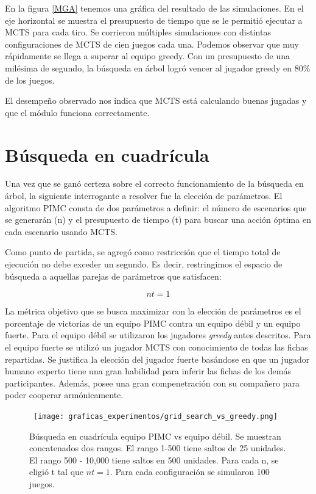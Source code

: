En la figura \ref{MGA} tenemos una gráfica del resultado de las simulaciones. En
el eje horizontal se muestra el presupuesto de tiempo que se le permitió
ejecutar a MCTS para cada tiro. Se corrieron múltiples simulaciones con
distintas configuraciones de MCTS de cien juegos cada una. Podemos observar que
muy rápidamente se llega a superar al equipo greedy. Con un presupuesto de una
milésima de segundo, la búsqueda en árbol logró vencer al jugador greedy en 80\%
de los juegos.

El desempeño observado nos indica que MCTS está calculando buenas jugadas y que
el módulo funciona correctamente.


\section{Búsqueda en cuadrícula}

Una vez que se ganó certeza sobre el correcto funcionamiento de la búsqueda en
árbol, la siguiente interrogante a resolver fue la elección de parámetros. El
algoritmo PIMC consta de dos parámetros a definir: el número de escenarios que
se generarán (n) y el presupuesto de tiempo (t) para buscar una acción óptima en
cada escenario usando MCTS.

Como punto de partida, se agregó como restricción que el tiempo total de
ejecución no debe exceder un segundo. Es decir, restringimos el espacio de
búsqueda a aquellas parejas de parámetros que satisfacen: 


\[nt = 1 \]

La métrica objetivo que se busca maximizar con la elección de parámetros es el
porcentaje de victorias de un equipo PIMC contra un equipo débil y un equipo
fuerte. Para el equipo débil se utilizaron los jugadores \textit{greedy} antes
descritos. Para el equipo fuerte se utilizó un jugador MCTS con conocimiento de
todas las fichas repartidas. Se justifica la elección del jugador fuerte
basándose en que un jugador humano experto tiene una gran habilidad para inferir
las fichas de los demás participantes. Además, posee una gran compenetración con
su compañero para poder cooperar armónicamente.

\begin{figure}[H]
    \begin{center}
        \hbox{\hspace{-2em}
        \texttt{[image: graficas\_experimentos/grid\_search\_vs\_greedy.png]}}
        \caption{Búsqueda en cuadrícula equipo PIMC vs equipo débil. Se muestran
        concatenados dos rangos. El rango 1-500 tiene saltos de 25 unidades. El
        rango 500 - 10,000 tiene saltos en 500 unidades. Para cada n, se eligió
        t tal que \(nt = 1\). Para cada configuración se simularon 100 juegos.}
        \label{GSW}
    \end{center}
\end{figure}

